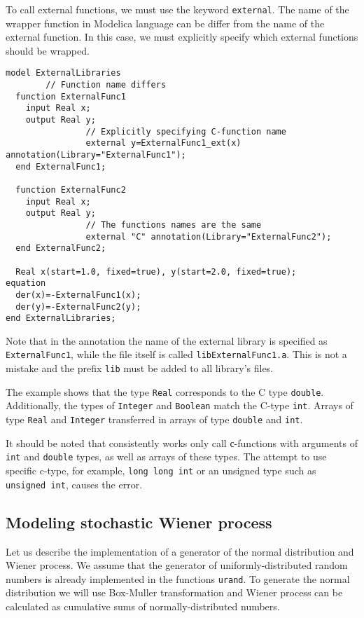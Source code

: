 \documentclass[%
floatfix,
showkeys,
nofootinbib, %
superscriptaddress, %
]{revtex4-1}
\begin{document}
To call external functions, we must use the keyword
\verb|external|. The name of the wrapper function in Modelica language
can be differ from the name of the external function. In this case, we
must explicitly specify which external functions should be wrapped.
\begin{verbatim}
model ExternalLibraries
        // Function name differs
  function ExternalFunc1
    input Real x;
    output Real y;
                // Explicitly specifying C-function name
                external y=ExternalFunc1_ext(x) annotation(Library="ExternalFunc1");
  end ExternalFunc1;

  function ExternalFunc2
    input Real x;
    output Real y;
                // The functions names are the same
                external "C" annotation(Library="ExternalFunc2");
  end ExternalFunc2;
  
  Real x(start=1.0, fixed=true), y(start=2.0, fixed=true);
equation
  der(x)=-ExternalFunc1(x);
  der(y)=-ExternalFunc2(y);
end ExternalLibraries;
\end{verbatim}

Note that in the annotation the name of the external library is
specified as \verb|ExternalFunc1|, while the file itself is called
\verb|libExternalFunc1.a|. This is not a mistake and the prefix
\verb|lib| must be added to all library's files.

The example shows that the type \verb|Real| corresponds to the C type
\verb|double|. Additionally, the types of \verb|Integer| and
\verb|Boolean| match the C-type \verb|int|. Arrays of type \verb|Real|
and \verb|Integer| transferred in arrays of type \verb|double| and
\verb|int|.

It should be noted that consistently works only call с-functions with
arguments of \verb|int| and \verb|double| types, as well as arrays of
these types. The attempt to use specific c-type, for example,
\verb|long long int| or an unsigned type such as \verb|unsigned int|,
causes the error.

\subsection{Modeling stochastic Wiener process}

Let us describe the implementation of a generator of the normal
distribution and Wiener process. We assume that the generator of
uniformly-distributed random numbers is already implemented in the
functions \verb|urand|. To generate the normal distribution we will
use Box-Muller transformation and Wiener process can be calculated as
cumulative sums of normally-distributed numbers.
\end{document}
